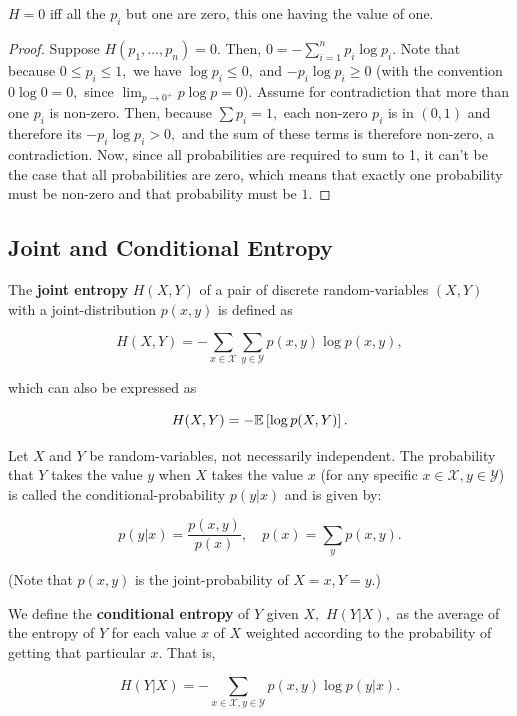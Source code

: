 \documentclass{article}
\begin{document}
\begin{theorem}
$H = 0$ iff all the $p_i$ but one are zero, this one having the value of one.
\end{theorem}

\begin{proof}
Suppose $H(p_1, \dots, p_n) = 0.$ Then, $0 = - \sum_{i=1}^n p_i \log{p_i}.$ Note that because $0 \leq p_i \leq 1,$ we have $\log{p_i} \leq 0,$ and $-p_i \log{p_i} \geq 0$ (with the convention $0 \log 0 = 0,$ since $\lim_{p \to 0^+} p \log p = 0$).  Assume for contradiction that more than one $p_i$ is non-zero. Then, because $\sum p_i = 1,$ each non-zero $p_i$ is in $(0, 1)$ and therefore its $- p_i \log{p_i} > 0,$ and the sum of these terms is therefore non-zero, a contradiction. Now, since all probabilities are required to sum to 1, it can't be the case that all probabilities are zero, which means that exactly one probability must be non-zero and that probability must be $1.$
\end{proof}

\subsection{Joint and Conditional Entropy}

\begin{definition}
	The \textbf{joint entropy} $H(X,Y)$ of a pair of \@{discrete} \@{random-variables} $(X,Y)$ with a \@{joint-distribution} $p(x,y)$ is defined as

\[ H(X,Y) = -\sum_{x \in \mathcal{X}} \sum_{y \in \mathcal{Y}} p(x,y) \log{p(x,y)}, \]

which can also be expressed as

	\[ H(X,Y) = - \mathbb{E} \left[\log{p(X,Y)}\right]. \]

\end{definition}

\begin{definition}
Let $X$ and $Y$ be \@{random-variables}, not necessarily \@{independent}. The probability that $Y$ takes the value $y$ when $X$ takes the value $x$ (for any specific $x \in \mathcal{X}, y \in \mathcal{Y}$) is called the \@{conditional-probability} $p(y|x)$ and is given by:

\[ p(y|x) = \frac{p(x, y)}{p(x)}, \quad p(x) = \sum_{y} p(x,y). \]

(Note that $p(x,y)$ is the \@{joint-probability} of $X = x, Y = y.$)

We define the \textbf{conditional entropy} of $Y$ given $X,$ $H(Y|X),$ as the average of the entropy of $Y$ for each value $x$ of $X$ weighted according to the probability of getting that particular $x.$ That is,

\[ H(Y|X) = -\sum_{x \in \mathcal{X}, y \in \mathcal{Y}} p(x,y) \log{p(y|x)}. \]
\end{definition}
\end{document}
